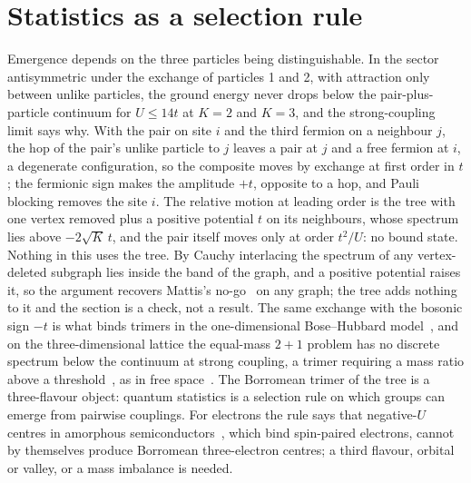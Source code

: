 \documentclass[aps,pre,twocolumn,superscriptaddress,floatfix]{revtex4-2}
\begin{document}
\section{Statistics as a selection rule}
\label{sec:fermions}
Emergence depends on the three
particles being distinguishable. In the sector antisymmetric under the
exchange of particles 1 and 2, with attraction only between unlike
particles, the ground energy never drops below the pair-plus-particle
continuum for $U\le14t$ at $K=2$ and $K=3$, and the strong-coupling limit
says why. With the pair on site $i$ and the third fermion on a
neighbour $j$, the hop of the pair's unlike particle to $j$ leaves a pair
at $j$ and a free fermion at $i$, a degenerate configuration, so the
composite moves by exchange at first order in $t$; the fermionic sign
makes the amplitude $+t$, opposite to a hop, and Pauli blocking removes
the site $i$. The relative motion at leading order is the tree with one
vertex removed plus a positive potential $t$ on its neighbours, whose
spectrum lies above $-2\sqrt{K}\,t$, and the pair itself moves only at
order $t^{2}/U$: no bound state. Nothing in this uses the tree. By Cauchy
interlacing the spectrum of any vertex-deleted subgraph lies inside the
band of the graph, and a positive potential raises it, so the argument
recovers Mattis's no-go~\cite{mattis1986} on any graph; the tree adds
nothing to it and the section is a check, not a result. The same exchange with the bosonic sign
$-t$ is what binds trimers in the one-dimensional Bose--Hubbard
model~\cite{valiente2010}, and on the three-dimensional lattice the
equal-mass $2+1$ problem has no discrete spectrum below the continuum at
strong coupling, a trimer requiring a mass ratio above a
threshold~\cite{abdullaev2026}, as in free
space~\cite{kartavtsev2007}. The Borromean trimer of the tree is a
three-flavour object: quantum statistics is a selection rule on which
groups can emerge from pairwise couplings. For electrons the rule says
that negative-$U$ centres in amorphous
semiconductors~\cite{anderson1975,weaire1971}, which bind spin-paired
electrons, cannot by themselves produce Borromean three-electron
centres; a third flavour, orbital or valley, or a mass imbalance is
needed.
\end{document}
